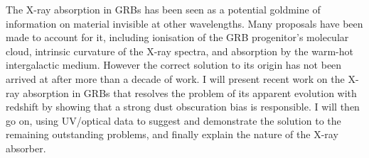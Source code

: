 


\bigskip



\bigskip

\noindent The X-ray absorption in GRBs has been seen as a potential goldmine of information on material invisible at other wavelengths. Many proposals have been made to account for it, including ionisation of the GRB progenitor’s molecular cloud, intrinsic curvature of the X-ray spectra, and absorption by the warm-hot intergalactic medium.  However the correct solution to its origin has not been arrived at after more than a decade of work. I will present recent work on the X-ray absorption in GRBs that resolves the  problem of its apparent evolution with redshift by showing that a strong dust obscuration bias is responsible. I will then go on, using UV/optical data to suggest and demonstrate the solution to the remaining outstanding problems, and finally explain the nature of the X-ray absorber.
